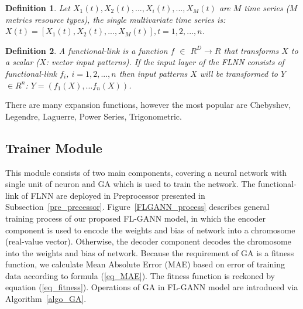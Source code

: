\documentclass[conference]{IEEEtran}
\newtheorem{definition}{Definition}
\begin{document}
\begin{definition}
\label{definition_1}
Let $X_1(t), X_2(t),. . . , X_i(t),. . . , X_M(t) $ are $M$ time series ($M$ metrics resource types), the single multivariate time series is: \\
$ X(t) = \left[ X_1(t), X_2(t), . . . , X_M (t) \right], t = 1, 2, . . . , n$.
\end{definition}

\begin{definition}
\label{definition_2}
A functional-link is a function $f$ $\in$ $R^D \rightarrow R$ that transforms $X$ to a scalar ($X$: vector input patterns). If the input layer of the FLNN consists of functional-link $f_i$, $i = 1,2,..., n$ then input patterns $X$ will be transformed to $Y$ $\in R^n$: $Y = (f_1(X),... f_n(X))$. 
\end{definition}

There are many expansion functions, however the most popular are Chebyshev, Legendre, Laguerre, Power Series, Trigonometric. 

\subsection{Trainer Module}
\label{learning_model}
This module consists of two main components, covering a neural network with single unit of neuron and GA which is used to train the network. The functional-link of FLNN are deployed in Preprocessor presented in Subsection~\ref{pre_precessor}. Figure~\ref{FLGANN_process} describes general training process of our proposed FL-GANN model, in which the encoder component is used to encode the weights and bias of network into a chromosome (real-value vector). Otherwise, the decoder component decodes the chromosome into the weights and bias of network. Because the requirement of GA is a fitness function, we calculate Mean Absolute Error (MAE) based on error of training data according to formula (\ref{eq_MAE}). The fitness function is reckoned by equation (\ref{eq_fitness}). Operations of GA in FL-GANN model are introduced via Algorithm~\ref{algo_GA}.
\end{document}
